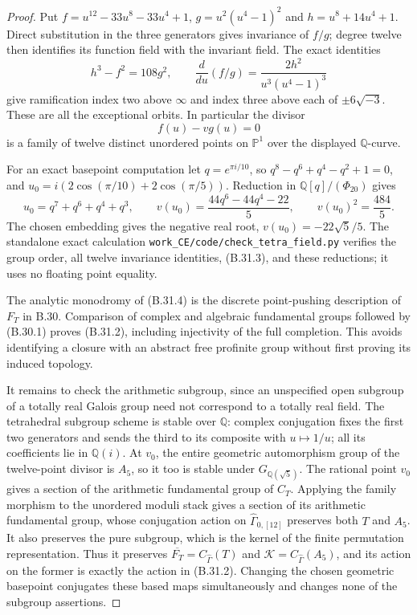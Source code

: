 \begin{proof}
Put $f=u^{12}-33u^8-33u^4+1$, $g=u^2(u^4-1)^2$ and
$h=u^8+14u^4+1$.  Direct substitution in the three
generators gives invariance of $f/g$; degree twelve
then identifies its function field with the invariant
field.  The exact identities
\[
 h^3-f^2=108g^2,\qquad
       \frac{d}{du}(f/g)=\frac{2h^2}{u^3(u^4-1)^3}         \tag{B.31.3}
\]
give ramification index two above $\infty$ and index
three above each of $\pm6\sqrt{-3}$.  These are all
the exceptional orbits.  In particular the divisor
\[
                               f(u)-vg(u)=0               \tag{B.31.4}
\]
is a family of twelve distinct unordered points on
$\mathbb P^1$ over the displayed $\mathbb Q$-curve.

For an exact basepoint computation let
$q=e^{\pi i/10}$, so $q^8-q^6+q^4-q^2+1=0$, and
$u_0=i(2\cos(\pi/10)+2\cos(\pi/5))$.
Reduction in $\mathbb Q[q]/(\Phi_{20})$ gives
\[
 u_0=q^7+q^6+q^4+q^3,\qquad
 v(u_0)=\frac{44q^6-44q^4-22}{5},\qquad
                       v(u_0)^2=\frac{484}{5}.
\]
The chosen embedding gives the negative real root,
$v(u_0)=-22\sqrt5/5$.  The standalone exact calculation
\texttt{work\_CE/code/check\_tetra\_field.py} verifies
the group order, all twelve invariance identities,
(B.31.3), and these reductions; it uses no floating
point equality.

The analytic monodromy of (B.31.4) is the discrete
point-pushing description of $F_T$ in B.30.  Comparison
of complex and algebraic fundamental groups followed
by (B.30.1) proves (B.31.2), including injectivity of
the full completion.  This avoids identifying a
closure with an abstract free profinite group without
first proving its induced topology.

It remains to check the arithmetic subgroup, since
an unspecified open subgroup of a totally real
Galois group need not correspond to a totally real
field.  The tetrahedral subgroup scheme is stable
over $\mathbb Q$: complex conjugation fixes the first
two generators and sends the third to its composite
with $u\mapsto1/u$; all its coefficients lie in
$\mathbb Q(i)$.  At $v_0$, the entire geometric
automorphism group of the twelve-point divisor is
$A_5$, so it too is stable under $G_{\mathbb Q(\sqrt5)}$.
The rational point $v_0$ gives a section of the
arithmetic fundamental group of $C_T$.  Applying the
family morphism to the unordered moduli stack gives
a section of its arithmetic fundamental group, whose
conjugation action on $\widehat\Gamma_{0,[12]}$
preserves both $T$ and $A_5$.  It also preserves the
pure subgroup, which is the kernel of the finite
permutation representation.  Thus it preserves
$\overline{F_T}=C_{\widehat\Gamma}(T)$ and
$\mathcal K=C_{\widehat\Gamma}(A_5)$, and its action
on the former is exactly the action in (B.31.2).
Changing the chosen geometric basepoint conjugates
these based maps simultaneously and changes none
of the subgroup assertions.
\end{proof}

